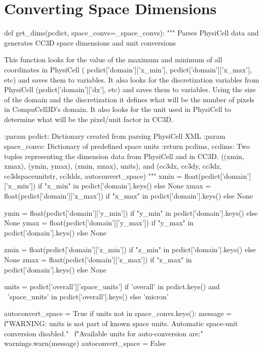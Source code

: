 

\section{Converting Space Dimensions}\label{appendix:trans:dim-conv}


\begin{python}
def get_dims(pcdict, space_convs=_space_convs):
    """
    Parses PhysiCell data and generates CC3D space dimensions and unit conversions

    This function looks for the value of the maximum and minimum of all coordinates in PhysiCell (
    pcdict['domain']['x_min'], pcdict['domain']['x_max'], etc) and saves them to variables. It also looks for the
    discretization variables from PhysiCell (pcdict['domain']['dx'], etc) and saves them to variables. Using the size of
    the domain and the discretization it defines what will be the number of pixels in CompuCell3D's domain.
    It also looks for the unit used in PhysiCell to determine what will be the pixel/unit factor in CC3D.

    :param pcdict: Dictionary created from parsing PhysiCell XML
    :param space_convs: Dictionary of predefined space units
    :return pcdims, ccdims: Two tuples representing the dimension data from PhysiCell and in CC3D.
          ((xmin, xmax), (ymin, ymax), (zmin, zmax), units), and
          (cc3dx, cc3dy, cc3dz, cc3dspaceunitstr, cc3dds, autoconvert_space)
    """
    xmin = float(pcdict['domain']['x_min']) if "x_min" in pcdict['domain'].keys() else None
    xmax = float(pcdict['domain']['x_max']) if "x_max" in pcdict['domain'].keys() else None

    ymin = float(pcdict['domain']['y_min']) if "y_min" in pcdict['domain'].keys() else None
    ymax = float(pcdict['domain']['y_max']) if "y_max" in pcdict['domain'].keys() else None

    zmin = float(pcdict['domain']['z_min']) if "z_min" in pcdict['domain'].keys() else None
    zmax = float(pcdict['domain']['z_max']) if "z_max" in pcdict['domain'].keys() else None

    units = pcdict['overall']['space_units'] if 'overall' in pcdict.keys() and \
                                                'space_units' in pcdict['overall'].keys() else 'micron'

    autoconvert_space = True
    if units not in space_convs.keys():
        message = f"WARNING: {units} is not part of known space units. Automatic space-unit conversion disabled." \
                  f"Available units for auto-conversion are:"
        warnings.warn(message)
        autoconvert_space = False


\end{python}
